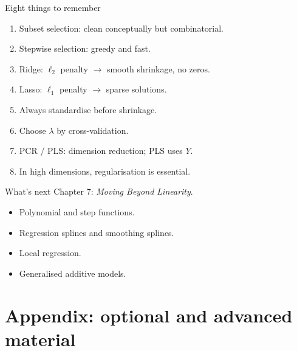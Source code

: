 \documentclass[aspectratio=169,11pt]{beamer}
\begin{document}
\begin{frame}{Eight things to remember}
  \begin{enumerate}
    \item Subset selection: clean conceptually but combinatorial.
    \item Stepwise selection: greedy and fast.
    \item Ridge: $\ell_2$ penalty $\to$ smooth shrinkage, no zeros.
    \item Lasso: $\ell_1$ penalty $\to$ sparse solutions.
    \item Always standardise before shrinkage.
    \item Choose $\lambda$ by cross-validation.
    \item PCR / PLS: dimension reduction; PLS uses $Y$.
    \item In high dimensions, regularisation is essential.
  \end{enumerate}
\end{frame}

\begin{frame}{What's next}
  Chapter 7: \emph{Moving Beyond Linearity}.
  \begin{itemize}
    \item Polynomial and step functions.
    \item Regression splines and smoothing splines.
    \item Local regression.
    \item Generalised additive models.
  \end{itemize}
\end{frame}


\appendix
\AtBeginSection[]{}
\section{Appendix: optional and advanced material}
\end{document}

